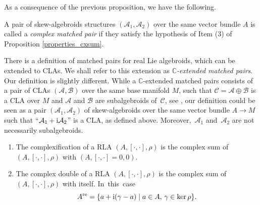 \documentclass[pdftex]{sigma}
\numberwithin{equation}{section}
\newcommand{\C}{{\mathbb{C}}}
\DeclareMathOperator{\real}{re}
\begin{document}
As a consequence of the previous proposition, we have the following.

\begin{Definition}
 A pair of skew-algebroids structures $(\mathcal{A}_1,\mathcal{A}_2)$ over the same vector bundle $A$ is called a {\em complex matched pair} if they satisfy the hypothesis of Item (3) of Proposition \ref{properties_cxsum}.
\end{Definition}
\begin{Remark}
   There is a definition of matched pairs for real Lie algebroids, which can be extended to CLAs. We shall refer to this extension as {\em $\C$-extended matched pairs}. Our definition is slightly different. While a $\C$-extended matched pairs consists of a pair of CLAs $(\mathcal{A},\mathcal{B})$ over the same base manifold $M$, such that $\mathcal{C}=\mathcal{A}\oplus \mathcal{B}$ is a CLA over $M$ and $\mathcal{A}$ and $\mathcal{B}$ are subalgebroids of~$\mathcal{C}$, see \cite[Definition~4.1]{mokri1997matched}, our definition could be seen as a pair $(\mathcal{A}_1,\mathcal{A}_2)$ of skew-algebroids over the same vector bundle $A\to M$ such that ``$\mathcal{A}_1+{\rm i}\mathcal{A}_2$'' is a CLA, as defined above. Moreover,~$\mathcal{A}_1$ and~$\mathcal{A}_2$ are not necessarily subalgebroids.
\end{Remark}
\begin{Examples}\quad
\begin{enumerate}\itemsep=0pt
\item The complexification of a RLA $(A, [\cdot, \cdot], \rho)$ is the complex sum of $(A, [\cdot, \cdot], \rho)$ with \linebreak ${(A, [\cdot, \cdot]=0, 0)}$.
\item The complex double of a RLA $(A, [\cdot, \cdot], \rho)$ is the complex sum of $(A, [\cdot, \cdot], \rho)$ with itself. In~this~case
\[A^{\real}=\{a+{\rm i}(\gamma-a)\mid a\in A, \, \gamma\in \ker\rho\}.\]

\end{enumerate}
\end{Examples}
\end{document}
